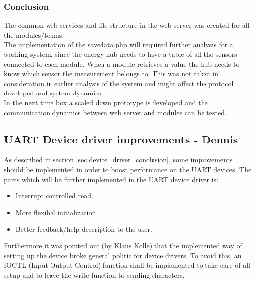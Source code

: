 \subsubsection{Conclusion}
The common web services and file structure in the web server was created for all the modules/teams.\\
The implementation of the savedata.php will required further analysis for a working system, since the energy hub needs to have a table of all the sensors connected to each module. When a module retrieves a value the hub needs to know which sensor the measurement belongs to. This was not taken in consideration in earlier analysis of the system and might affect the protocol developed and system dynamics.\\
In the next time box a scaled down prototype is developed and the communication dynamics between web server and modules can be tested.

\subsection{UART Device driver improvements - Dennis}
As described in section \ref{sec:device_driver_conclusion}, some improvements should be implemented in order to boost performance on the UART devices. The parts which will be further implemented in the UART device driver is:
\begin{itemize}
	\item Interrupt controlled read.
	\item More flexibel initialization. 
	\item Better feedback/help description to the user. 
\end{itemize}
Furthermore it was pointed out (by Klaus Kolle) that the implemented way of setting up the device broke general politic for device drivers. To avoid this, an IOCTL (Input Output Control) function shall be implemented to take care of all setup and to leave the write function to sending characters. 
%
%
%
